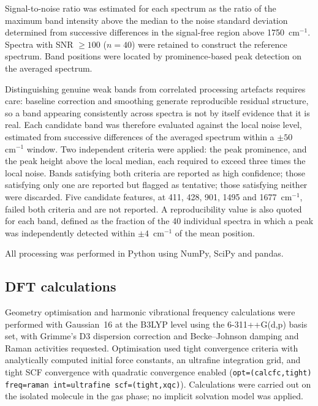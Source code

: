 \documentclass[11pt,a4paper]{article}
\newcommand{\wn}{\ensuremath{\mathrm{cm}^{-1}}}
\begin{document}
Signal-to-noise ratio was estimated for each spectrum as the ratio of the
maximum band intensity above the median to the noise standard deviation
determined from successive differences in the signal-free region above
1750~\wn{}. Spectra with SNR $\geq 100$ ($n = 40$) were retained to construct the reference
spectrum. Band positions were located by prominence-based peak detection on the
averaged spectrum.

Distinguishing genuine weak bands from correlated processing artefacts requires
care: baseline correction and smoothing generate reproducible residual
structure, so a band appearing consistently across spectra is not by itself
evidence that it is real. Each candidate band was therefore evaluated against
the local noise level, estimated from successive differences of the averaged
spectrum within a $\pm 50$~\wn{} window. Two independent criteria were applied:
the peak prominence, and the peak height above the local median, each required
to exceed three times the local noise. Bands satisfying both criteria are
reported as high confidence; those satisfying only one are reported but flagged
as tentative; those satisfying neither were discarded. Five candidate features,
at 411, 428, 901, 1495 and 1677~\wn{}, failed both criteria and are not
reported. A reproducibility value is also quoted for each band, defined as the
fraction of the 40 individual spectra in which a peak was independently detected
within $\pm 4$~\wn{} of the mean position.

All processing was performed in Python using NumPy, SciPy and pandas.

\subsection{DFT calculations}

Geometry optimisation and harmonic vibrational frequency calculations were
performed with Gaussian~16 \cite{gaussian16} at the B3LYP level
\cite{becke1993,lee1988} using the 6-311++G(d,p) basis set, with Grimme's D3
dispersion correction and Becke--Johnson damping \cite{grimme2011} and Raman
activities requested. Optimisation used tight convergence criteria with
analytically computed initial force constants, an ultrafine integration grid,
and tight SCF convergence with quadratic convergence enabled
(\texttt{opt=(calcfc,tight) freq=raman int=ultrafine scf=(tight,xqc)}).
Calculations were carried out on the isolated molecule in the gas phase; no
implicit solvation model was applied.
\end{document}
